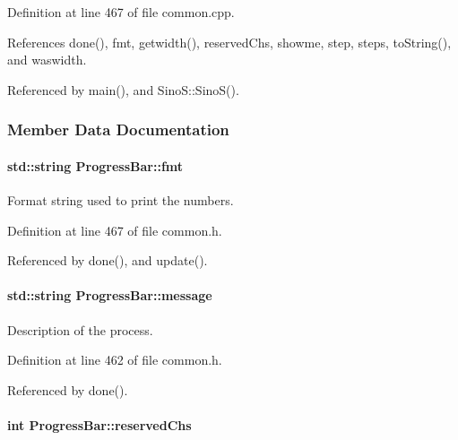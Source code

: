 Definition at line 467 of file common.cpp.



References done(), fmt, getwidth(), reservedChs, showme, step, steps, toString(), and waswidth.



Referenced by main(), and SinoS::SinoS().



\subsubsection{Member Data Documentation}
\hypertarget{classProgressBar_a17e91afec3e36712d161118634acb9c2}{
\paragraph[{fmt}]{\setlength{\rightskip}{0pt plus 5cm}std::string {\bf ProgressBar::fmt}}\hfill}
\label{classProgressBar_a17e91afec3e36712d161118634acb9c2}


Format string used to print the numbers. 



Definition at line 467 of file common.h.



Referenced by done(), and update().

\hypertarget{classProgressBar_a7fdd22154b95fafd723f087c7c2800f0}{
\paragraph[{message}]{\setlength{\rightskip}{0pt plus 5cm}std::string {\bf ProgressBar::message}}\hfill}
\label{classProgressBar_a7fdd22154b95fafd723f087c7c2800f0}


Description of the process. 



Definition at line 462 of file common.h.



Referenced by done().

\hypertarget{classProgressBar_a5719f553f74549c2c70375a095857e7a}{
\paragraph[{reservedChs}]{\setlength{\rightskip}{0pt plus 5cm}int {\bf ProgressBar::reservedChs}}\hfill}
\label{classProgressBar_a5719f553f74549c2c70375a095857e7a}



